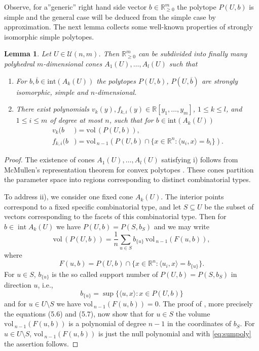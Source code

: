 \documentclass[11pt, a4paper, twoside, reqno]{amsart}
\DeclareMathOperator*{\inter}{int}
\newcommand{\R}{\mathbb{R}}
\newtheorem{lemma}[theorem]{Lemma}
\theoremstyle{definition}
\theoremstyle{remark}
\newcommand{\vol}{\mathrm{vol}\,}
\newcommand{\ov}{\overline}
\numberwithin{equation}{section}
\begin{document}
Observe, for  a''generic'' right hand side vector $b\in\R^m_{\geq 0}$ the polytope $P(U,b)$ is simple and the general case will be deduced from the simple case by approximation. The next lemma collects some well-known properties of strongly isomorphic simple polytopes.
\begin{lemma} Let $U\in\mathcal{U}(n,m)$.  Then  $\R^m_{\geq 0}$ can be subdivided into finally many polyhedral $m$-dimensional cones $A_1(U), \dots, A_l(U)$ such that
    \begin{enumerate}
    \item    For $b,\ov b\in\mathrm{int}(A_k(U))$ the polytopes $P(U,b)$, $P(U,\ov b)$ are strongly isomorphic, simple and $n$-dimensional.
    \item  There exist polynomials $v_k(y), f_{k,i}(y)\in\R[y_1,\dots,y_m]$, $1\leq k\leq l$, and $1\leq i\leq m$ of degree at most $n$, such that for $b\in  \mathrm{int}(A_k(U))$
      \begin{equation*}
        \begin{split}
          v_k(b &)=\vol(P(U,b)), \\
          f_{k,i}(b&)=\vol_{n-1}\left(P(U,b)\cap\{x\in \R^n: \langle u_i, x\rangle=b_i\}\right).
        \end{split}
      \end{equation*}
    \end{enumerate}
\label{lem:mainsemi}
\end{lemma}
\begin{proof} The existence of cones \( A_1(U), \dots, A_l(U) \) satisfying i) follows from McMullen's representation theorem for convex polytopes \cite{mcmullen1973representations}. These cones partition the parameter space into regions corresponding to distinct combinatorial types.

  To address ii), we consider one fixed cone \( A_k(U) \). The interior points  correspond to a fixed specific combinatorial type, and let $S\subseteq U$ be the subset of vectors corresponding to the facets of this combinatorial type.
  Then for $b\in \inter A_k(U)$  we have $P(U,b)=P(S,b_S)$  and we may write
  \begin{equation}
    \vol(P(U,b))=%
     \frac{1}{n}\sum_{u\in S} b_{\{u\}}\, \vol_{n-1}(F(u,b)),
\label{eq:sumpoly}
\end{equation}
where
\begin{equation*}
  F(u,b)=P(U,b)\cap\{x\in \R^n: \langle u_i, x\rangle=b_{\{u\}}\}.
\end{equation*}
For $u\in S$, $b_{\{u\}}$ is the so called support number of $P(U,b)=P(S,b_S)$ in direction $u$, i.e.,
\begin{equation*}
   b_{\{u\}}=\sup\{\langle u, x\rangle: x\in P(U,b)\}
\end{equation*}
and for $u\in U\setminus S$ we have $ \vol_{n-1}(F(u,b)) =0$. The proof of \cite[Lemma 5.1.3]{Schneider2014}, more precisely the equations (5.6) and (5.7), now show that for $u\in S$ the volume $\vol_{n-1}(F(u,b))$ is a polynomial  of degree $n-1$ in the coordinates of $b_S$. For $u\in U\setminus S$,  $\vol_{n-1}(F(u,b))$ is just the null polynomial and with \eqref{eq:sumpoly} the assertion follows.
\end{proof}
\end{document}
